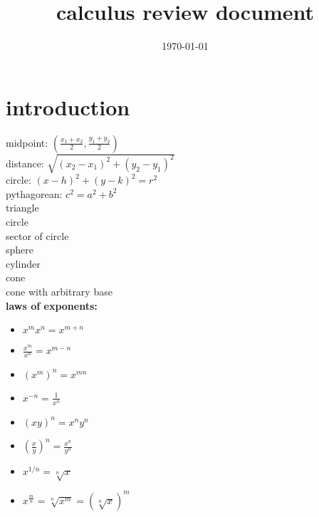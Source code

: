 \documentclass{article}
\title{calculus review document}
\date{\today}
\begin{document}
\maketitle

\section*{introduction}

	midpoint: $(\frac{x_1 + x_2}{2}, \frac{y_1 + y_2}{2})$\\
	distance: $\sqrt{(x_2 - x_1)^2 + (y_2 - y_1)^2}$\\
	circle: $(x - h)^2 + (y - k)^2 = r^2$\\
	pythagorean: $c^2 = a^2 + b^2$\\

	triangle\\
	circle\\
	sector of circle\\
	sphere\\
	cylinder\\
	cone\\
	cone with arbitrary base\\

\textbf{laws of exponents:} 
	\begin{itemize}
		\item $x^mx^n = x^{m+n}$
		\item $\frac{x^m}{x^n} = x^{m-n}$
		\item $(x^m)^n = x^{mn}$
		\item $x^{-n} = \frac{1}{x^n}$
		\item $(xy)^n = x^ny^n$
		\item $(\frac{x}{y})^n = \frac{x^n}{y^n}$ \item $x^{1/n} = \sqrt[n]{x}$
		\item $x^{\frac{m}{n}} = \sqrt[n]{x^m} = (\sqrt[n]{x})^m$
	\end{itemize}
\end{document}
